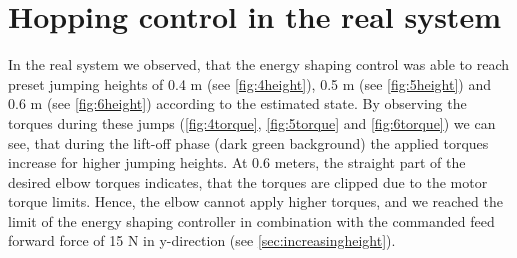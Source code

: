 \documentclass[onecolumn, letter paper]{report}
\begin{document}


\clearpage
\section{Hopping control in the real system}
In the real system we observed, that the  energy shaping control was able to reach preset jumping heights of 0.4 m (see \autoref{fig:4height}), 0.5 m (see \autoref{fig:5height}) and 0.6 m (see \autoref{fig:6height}) according to the estimated state. By observing the torques during these jumps (\autoref{fig:4torque}, \ref{fig:5torque} and \ref{fig:6torque}) we can see, that during the lift-off phase (dark green background) the applied torques increase for higher jumping heights. At 0.6 meters, the straight part of the desired elbow torques indicates, that the torques are clipped due to the motor torque limits. Hence, the elbow cannot apply higher torques, and we reached the limit of the energy shaping controller in combination with the commanded feed forward force of 15 N in y-direction (see \autoref{sec:increasingheight}). 
\end{document}
